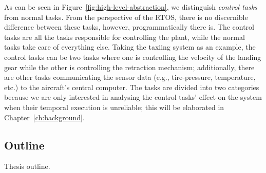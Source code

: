 As can be seen in Figure~\ref{fig:high-level-abstraction}, we distinguish \emph{control tasks} from normal tasks.
From the perspective of the RTOS, there is no discernible difference between these tasks, however, programmatically there is.
The control tasks are all the tasks responsible for controlling the plant, while the normal tasks take care of everything else.
Taking the taxiing system as an example, the control tasks can be two tasks where one is controlling the velocity of the landing gear while the other is controlling the retraction mechanism; additionally, there are other tasks communicating the sensor data (e.g., tire-pressure, temperature, etc.) to the aircraft's central computer.
The tasks are divided into two categories because we are only interested in analysing the control tasks' effect on the system when their temporal execution is unreliable; this will be elaborated in Chapter~\ref{ch:background}.




\subsection*{Outline}%
%
Thesis outline.
